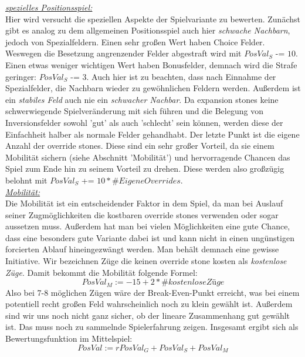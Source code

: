 \underline{\textit{spezielles Positionsspiel:}}\\
Hier wird versucht die speziellen Aspekte der Spielvariante zu bewerten.
Zunächst gibt es analog zu dem allgemeinen Positionsspiel auch hier \textit{schwache Nachbarn}, jedoch von Spezialfeldern. Einen sehr großen Wert haben Choice Felder. Weswegen die Besetzung angrenzender Felder abgestraft wird mit $PosVal_S$ -= $10$. Einen etwas weniger wichtigen Wert haben Bonusfelder, demnach wird die Strafe geringer: $PosVal_S$ -= $3$. Auch hier ist zu beachten, dass nach Einnahme der Spezialfelder, die Nachbarn wieder zu gewöhnlichen Feldern werden. Außerdem ist ein \textit{stabiles Feld} auch nie ein \textit{schwacher Nachbar}.
Da expansion stones keine schwerwiegende Spielveränderung mit sich führen und die Belegung von Inversionsfelder sowohl 'gut' als auch 'schlecht' sein können, werden diese der Einfachheit halber als normale Felder gehandhabt. Der letzte Punkt ist die eigene Anzahl der override stones. Diese sind ein sehr großer Vorteil, da sie einem Mobilität sichern (siehe Abschnitt 'Mobilität') und hervorragende Chancen das Spiel zum Ende hin zu seinem Vorteil zu drehen. Diese werden also großzügig belohnt mit $PosVal_S$ += $10 * \#EigeneOverrides$.\\

\underline{\textit{Mobilität:}}\\
Die Mobilität ist ein entscheidender Faktor in dem Spiel, da man bei Auslauf seiner Zugmöglichkeiten die kostbaren override stones verwenden oder sogar aussetzen muss. Außerdem hat man bei vielen Möglichkeiten eine gute Chance, dass eine besonders gute Variante dabei ist und kann nicht in einen ungünstigen forcierten Ablauf hineingezwängt werden. Man behält demnach eine gewisse Initiative. Wir bezeichnen Züge die keinen override stone kosten als \textit{kostenlose Züge}. Damit bekommt die Mobilität folgende Formel:
$$PosVal_M := -15 + 2*\#kostenloseZüge$$
Also bei 7-8 möglichen Zügen wäre der Break-Even-Punkt erreicht, was bei einem potentiell recht großen Feld wahrscheinlich noch zu klein gewählt ist. Außerdem sind wir uns noch nicht ganz sicher, ob der lineare Zusammenhang gut gewählt ist. Das muss noch zu sammelnde Spielerfahrung zeigen.
Insgesamt ergibt sich als Bewertungsfunktion im Mittelspiel:
$$PosVal := rPosVal_G + PosVal_S + PosVal_M$$
